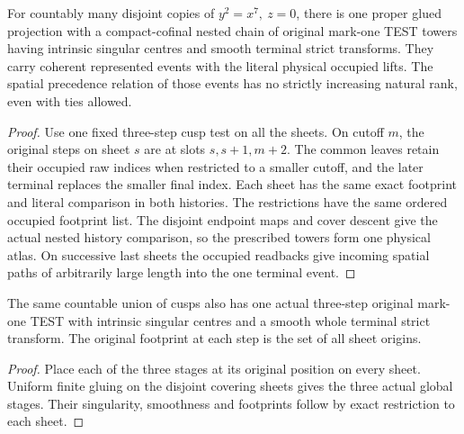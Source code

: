 \begin{theorem}
\leanok
For countably many disjoint copies of \(y^2=x^7,\ z=0\),
there is one proper glued projection with a compact-cofinal
nested chain of original mark-one TEST towers having intrinsic
singular centres and smooth terminal strict transforms. They
carry coherent represented events with the literal physical
occupied lifts. The spatial precedence relation of those events
has no strictly increasing natural rank, even with ties allowed.
\end{theorem}
\begin{proof}
Use one fixed three-step cusp test on all the sheets. On cutoff
\(m\), the original steps on sheet \(s\) are at slots \(s,s+1,m+2\).
The common leaves retain their occupied raw indices when
restricted to a smaller cutoff, and the later terminal replaces
the smaller final index. Each sheet has the same exact footprint
and literal comparison in both histories. The restrictions have
the same ordered occupied footprint list. The disjoint endpoint
maps and cover descent give the actual nested history comparison,
so the prescribed towers form one physical atlas. On successive
last sheets the occupied readbacks give incoming spatial paths
of arbitrarily large length into the one terminal event.
\end{proof}

\begin{proposition}
\label{hir:g8-cusp-sheets-three-step-wide-test}
\leanok
The same countable union of cusps also has one actual
three-step original mark-one TEST with intrinsic singular
centres and a smooth whole terminal strict transform. The
original footprint at each step is the set of all sheet origins.
\end{proposition}
\begin{proof}
Place each of the three stages at its original position on
every sheet. Uniform finite gluing on the disjoint covering
sheets gives the three actual global stages. Their singularity,
smoothness and footprints follow by exact restriction to each
sheet.
\end{proof}

